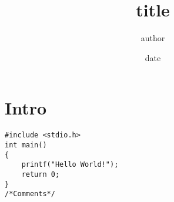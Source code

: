 \documentclass[11pt, letterpaper]{article}
\author{author}
\title{title}
\date{date}
\begin{document}
\maketitle
{}
\newpage

\section{Intro}
\begin{lstlisting}
#include <stdio.h>
int main()
{
    printf("Hello World!");
    return 0;
}
/*Comments*/

\end{lstlisting}


% 
\end{document}
